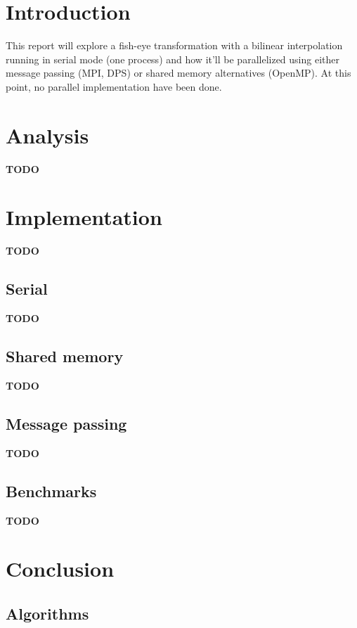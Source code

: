 \documentclass[10pt,a4paper]{article}
\begin{document}
\maketitle

\section{Introduction}

This report will explore a fish-eye transformation with a bilinear
interpolation running in serial mode (one process) and how it’ll be
parallelized using either message passing (MPI, DPS) or shared memory
alternatives (OpenMP). At this point, no parallel implementation have been
done.

\section{Analysis}
\textbf{TODO}

\section{Implementation}
\textbf{TODO}

\subsection{Serial}
\textbf{TODO}

\subsection{Shared memory}
\textbf{TODO}

\subsection{Message passing}
\textbf{TODO}

\subsection{Benchmarks}
\textbf{TODO}

\section{Conclusion}

\subsection{Algorithms}
\end{document}
